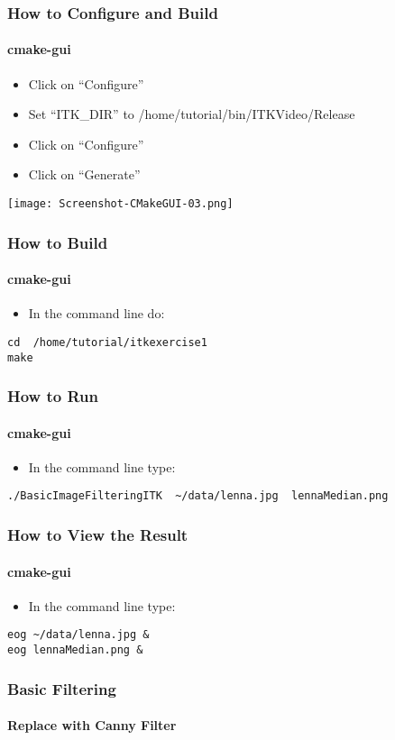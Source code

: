 \begin{frame}[fragile]
\frametitle{How to Configure and Build}
\framesubtitle{cmake-gui}
\begin{itemize}
\item Click on ``Configure''
\item Set ``ITK\_DIR'' to /home/tutorial/bin/ITKVideo/Release
\item Click on ``Configure''
\item Click on ``Generate''
\end{itemize}
\begin{center}
  \texttt{[image: Screenshot-CMakeGUI-03.png]}
\end{center}
\end{frame}

\begin{frame}[fragile]
\frametitle{How to Build}
\framesubtitle{cmake-gui}
\begin{itemize}
\item In the command line do:
\end{itemize}
\begin{verbatim}
cd  /home/tutorial/itkexercise1
make
\end{verbatim}
\end{frame}

\begin{frame}[fragile]
\frametitle{How to Run}
\framesubtitle{cmake-gui}
\begin{itemize}
\item In the command line type:
\end{itemize}
\begin{verbatim}
./BasicImageFilteringITK  ~/data/lenna.jpg  lennaMedian.png
\end{verbatim}
\end{frame}

\begin{frame}[fragile]
\frametitle{How to View the Result}
\framesubtitle{cmake-gui}
\begin{itemize}
\item In the command line type:
\end{itemize}
\begin{verbatim}
eog ~/data/lenna.jpg &
eog lennaMedian.png &
\end{verbatim}
\end{frame}


\begin{frame}
\frametitle{Basic Filtering}
\framesubtitle{Replace with Canny Filter}
\begin{center}

\end{center}
\end{frame}

